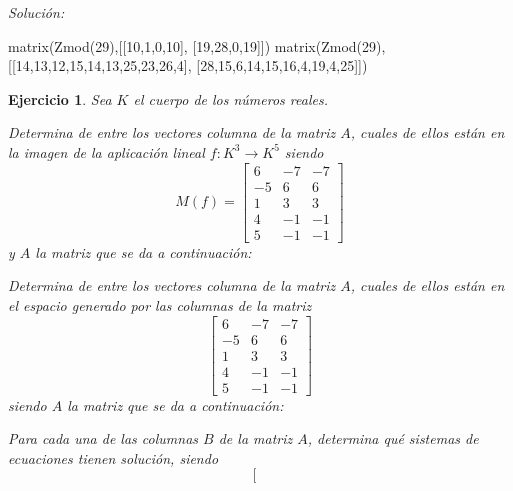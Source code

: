\documentclass[12pt]{amsart}
\newtheorem{ejer}{Ejercicio}
\begin{document}
{\it Soluci\'on:}

\begin{sageblock}
matrix(Zmod(29),[[10,1,0,10],
[19,28,0,19]])
matrix(Zmod(29),[[14,13,12,15,14,13,25,23,26,4],
[28,15,6,14,15,16,4,19,4,25]])
\end{sageblock}



\begin{ejer} Sea $K$ el cuerpo de los n\'umeros reales.
\newline
\noindent\begin{minipage}{\textwidth}
\begin{tcolorbox}[colback = green!20!white,title=Versión Núcleo]
Determina de entre los vectores columna de la matriz $A$, cuales de ellos están en la imagen de la aplicación lineal $f:K^{3} \to K^{5}$ siendo  $$ M(f) = \left[\begin{array}{rrr}
6 & -7 & -7 \\
-5 & 6 & 6 \\
1 & 3 & 3 \\
4 & -1 & -1 \\
5 & -1 & -1
\end{array}\right] $$ y $A$ la matriz que se da a continuación:\end{tcolorbox}
\end{minipage} \newline
\noindent\begin{minipage}{\textwidth}
\begin{tcolorbox}[colback = blue!20!white,title=Versión Anulador]
Determina de entre los vectores columna de la matriz $A$, cuales de ellos están en el espacio generado por las columnas de la matriz $$ \left[\begin{array}{rrr}
6 & -7 & -7 \\
-5 & 6 & 6 \\
1 & 3 & 3 \\
4 & -1 & -1 \\
5 & -1 & -1
\end{array}\right] $$ siendo $A$ la matriz que se da a continuación:\end{tcolorbox}
\end{minipage} \newline
\noindent\begin{minipage}{\textwidth} 
\begin{tcolorbox}[colback = red!20!white,title=Versión Ecuaciones Implícitas]
Para cada una de las columnas $B$ de la matriz $A$, determina qué sistemas de ecuaciones tienen solución, siendo $$ \left[\begin{array}{rrr}

\end{array}$$
\end{tcolorbox}
\end{minipage}
\end{ejer}
\end{document}
